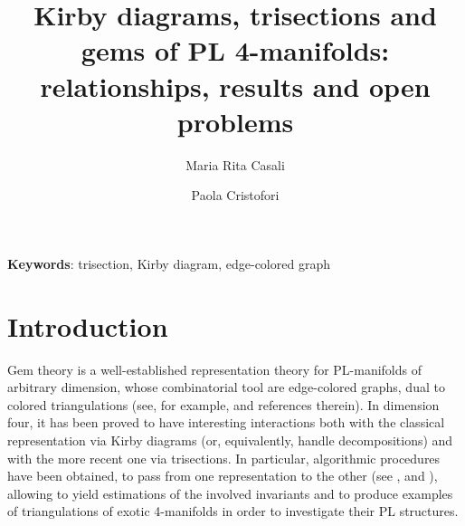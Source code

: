 \documentclass[12pt,a4paper]{article}
\begin{document}
\title{Kirby diagrams, trisections and gems of PL 4-manifolds: \\ 
relationships, results and open problems}


 \renewcommand{\Authfont}{\scshape\small}
 \renewcommand{\Affilfont}{\itshape\small}
 \renewcommand{\Authand}{ and }

\author[1] {Maria Rita Casali}
\author[2] {Paola Cristofori}



\maketitle

\endabstract

\bigskip
  \par \noindent
  {\small {\bf Keywords}: trisection, Kirby diagram, edge-colored graph}

 \medskip
  


\section{Introduction}

Gem theory is a well-established representation theory for PL-manifolds of arbitrary dimension, whose combinatorial tool are edge-colored graphs, dual to colored triangulations (see, for example, \cite{generalized-genus} and references therein). 
In dimension four, it has been proved to have interesting interactions both with the classical representation via Kirby diagrams (or, equivalently, handle decompositions) and with the more recent one via trisections. In particular, algorithmic procedures have been obtained, to pass from one representation to the other (see \cite{Casali-Cristofori Kirby-diagrams}, \cite{Casali-Cristofori gem-induced} and \cite{Casali-Cristofori trisection bis}), allowing to yield estimations of the involved invariants and to produce examples of triangulations of exotic 4-manifolds in order to investigate their PL structures. 
\end{document}
